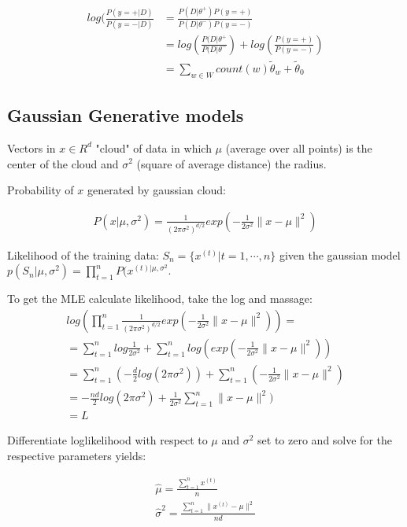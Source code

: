\begin{align*}
log(\frac{P(y=+|D)}{P(y=-|D)} &= \frac{ P(D | \theta ^{+}) P(y = +)}{P(D | \theta ^{-}) P(y = -)}\\
&= log(\frac{P(D | \theta ^{+}}{P(D | \theta ^{-}}) + log(\frac{P(y = +)}{P(y = -)})\\
&= \sum_{w \in W} count(w) \tilde{\theta}_w + \tilde{\theta}_0
\end{align*}

\subsection{Gaussian Generative models}

Vectors in $x \in R^d$ "cloud" of data in which $\mu$ (average over all points) is the center of the cloud and $\sigma^2$ (square of average distance) the radius.

Probability of $x$ generated by gaussian cloud:

\begin{align*}
P(x | \mu , \sigma ^2) = \frac{1}{(2\pi \sigma ^2)^{d/2}} exp(-\frac{1}{2\sigma ^2} \|  x - \mu \| ^2)
\end{align*}

Likelihood of the training data: $S_n=\{x^{(t)}|t=1,\cdots,n\}$ given the gaussian model $p(S_n|\mu,\sigma^2)=\prod_{t=1}^n P(x^{(t)|\mu,\sigma^2}$.

To get the MLE calculate likelihood, take the log and massage:
\begin{align*}
log(\prod_{t=1}^n \frac{1}{(2\pi \sigma ^2)^{d/2}} exp(-\frac{1}{2\sigma ^2} \|  x - \mu \| ^2)) =\\
= \sum_{t=1}^n log \frac{1}{2\sigma ^2} + \sum_{t=1}^n log (exp(-\frac{1}{2\sigma ^2} \|  x - \mu \| ^2))\\
= \sum_{t=1}^n( -\frac{d}{2} log(2\pi\sigma^2)) + \sum_{t=1}^n (- \frac{1}{2\sigma^2}  \|  x - \mu \| ^2) \\
= -\frac{nd}{2}log(2\pi\sigma^2) + \frac{1}{2\sigma^2} \sum_{t=1}^n \|  x - \mu \| ^2) \\
= L
\end{align*}

Differentiate loglikelihood with respect to $\mu$ and $\sigma^2$ set to zero and solve for the respective parameters yields:

\begin{align*}
\hat{\mu } = \frac{\sum _{t=1}^{n} x^{(t)}}{n}\\
\hat{\sigma }^2 = \frac{\sum _{t=1}^ n \| x^{(t)} - \mu \| ^2}{nd}
\end{align*}

